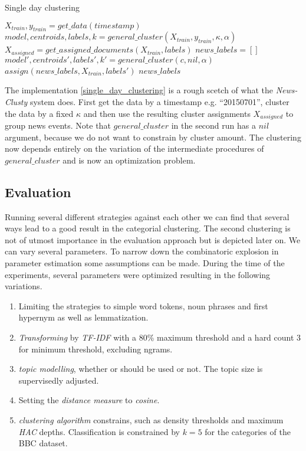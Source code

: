     \begin{algorithm}[H]
    \begin{algorithmic}[1]
      \caption{Single day clustering}\label{single_day_clustering}
        \State $X_{train},y_{train} = get\_data(timestamp)$
        \State $model,centroids,labels,k = general\_cluster(X_{train},y_{train},\kappa,\alpha)$
        \State $X_{assigned} = get\_assigned\_documents(X_{train},labels)$
        \State $news\_labels = []$
          \State $model',centroids',labels',k' = general\_cluster(c,nil,\alpha)$
          \State $assign(news\_labels, X_{train}, labels')$
        \EndFor
        \State \Return $news\_labels$
    \end{algorithmic}
    \end{algorithm}

  The implementation \ref{single_day_clustering} is a rough scetch of what the \emph{News-Clusty} system does. First get the data by a timestamp e.g. ``20150701'', cluster the data by a fixed $\kappa$ and then use the resulting cluster assignments $X_{assigned}$ to group news events. Note that $general\_cluster$ in the second run has a $nil$ argument, because we do not want to constrain by cluster amount. The clustering now depends entirely on the variation of the intermediate procedures of $general\_cluster$ and is now an optimization problem. 

  \subsection{Evaluation}
  Running several different strategies against each other we can find that several ways lead to a good result in the categorial clustering. The second clustering is not of utmost importance in the evaluation approach but is depicted later on. We can vary several parameters. To narrow down the combinatoric explosion in parameter estimation some assumptions can be made. During the time of the experiments, several parameters were optimized resulting in the following variations.

    \begin{enumerate}
      \item Limiting the strategies to simple word tokens, noun phrases and \wordnet{} first hypernym as well as lemmatization.

      \item \emph{Transforming} by \emph{TF-IDF} with a 80\% maximum threshold and a hard count $3$ for minimum threshold, excluding ngrams.

      \item \emph{topic modelling}, whether \lsa{} or \lda{} should be used or not. The topic size is supervisedly adjusted.

      \item Setting the \emph{distance measure} to \emph{cosine}.

      \item \emph{clustering algorithm} constrains, such as density thresholds and maximum \emph{HAC} depths. Classification is constrained by $k=5$ for the categories of the BBC dataset.
    \end{enumerate}

